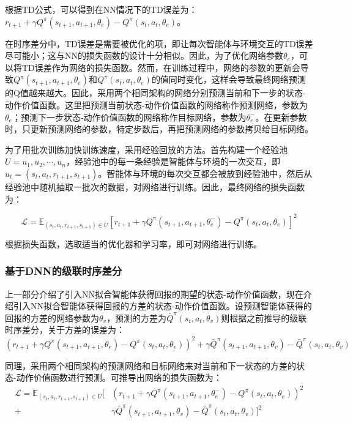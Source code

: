 \documentclass[UTF8]{ctexart}
\begin{document}
根据TD公式，可以得到在NN情况下的TD误差为：$r_{t+1} + \gamma Q^\pi(s_{t+1}, a_{t+1}, \theta_e) - Q^\pi(s_t, a_t, \theta_e)$。

在时序差分中，TD误差是需要被优化的项，即让每次智能体与环境交互的TD误差尽可能小；这与NN的损失函数的设计十分相似。因此，为了优化网络参数$\theta_e$，可以将TD误差作为网络的损失函数。然而，在训练过程中，网络的参数的更新会导致$Q^\pi(s_{t+1}, a_{t+1}, \theta_e)$和$Q^\pi(s_t, a_t, \theta_e)$的值同时变化，这样会导致最终网络预测的Q值越来越大。因此，采用两个相同架构的网络分别预测当前和下一步的状态-动作价值函数。这里把预测当前状态-动作价值函数的网络称作预测网络，参数为$\theta_e$；预测下一步状态-动作价值函数的网络称作目标网络，参数为$\theta^-_e$。在更新参数时，只更新预测网络的参数，特定步数后，再把预测网络的参数拷贝给目标网络。

为了用批次训练加快训练速度，采用经验回放的方法。首先构建一个经验池$U = {u_1, u_2, \cdots, u_n}$，经验池中的每一条经验是智能体与环境的一次交互，即$u_t = (s_t, a_t, r_{t+1}, s_{t+1})$。智能体与环境的每次交互都会被放到经验池中，然后从经验池中随机抽取一批次的数据，对网络进行训练。因此，最终网络的损失函数为：

$$
\mathcal{L} = \mathbb{E}_{(s_t, a_t, r_{t+1}, s_{t+1}) \in U}[r_{t+1} + \gamma Q^\pi(s_{t+1}, a_{t+1}, \theta^-_e) - Q^\pi(s_t, a_t, \theta_e)]^2
$$

根据损失函数，选取适当的优化器和学习率，即可对网络进行训练。

\subsubsection{基于DNN的级联时序差分}

上一部分介绍了引入NN拟合智能体获得回报的期望的状态-动作价值函数，现在介绍引入NN拟合智能体获得回报的方差的状态-动作价值函数。设预测智能体获得的回报的方差的网络参数为$\theta_v$，预测的方差为$\bar{Q}^\pi(s_t, a_t, \theta_v)$则根据之前推导的级联时序差分，关于方差的误差为：
$$
(r_{t+1} + \gamma Q^\pi(s_{t+1}, a_{t+1}, \theta_e) - Q^\pi(s_t, a_t, \theta_e))^2 + \gamma \bar{Q}^\pi(s_{t+1}, a_{t+1}, \theta_v) - \bar{Q}^\pi(s_t, a_t, \theta_v)
$$

同理，采用两个相同架构的预测网络和目标网络来对当前和下一状态的方差的状态-动作价值函数进行预测。可推导出网络的损失函数为：
\begin{align*}
\mathcal{L} = \mathbb{E}_{(s_t, a_t, r_{t+1}, s_{t+1}) \in U}[&(r_{t+1} + \gamma Q^\pi(s_{t+1}, a_{t+1}, \theta^-_e) - Q^\pi(s_t, a_t, \theta_e))^2 \\
+ &\gamma \bar{Q}^\pi(s_{t+1}, a_{t+1}, \theta_v) - \bar{Q}^\pi(s_t, a_t, \theta_v)]^2
\end{align*}
\end{document}
